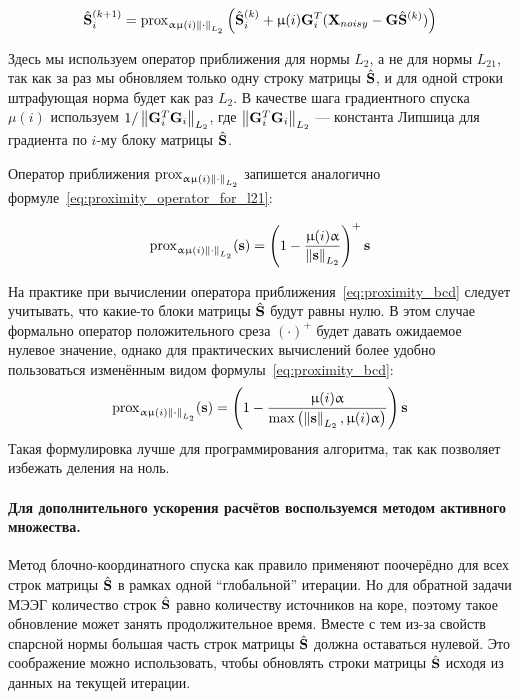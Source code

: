 \begin{equation}
    \hat{\mathbf{S}}_i^{(k+1)} = \operatorname{prox}_{\upalpha\upmu(i)\left\lVert\cdot\right\rVert_{L_{2}}} \left(\hat{\mathbf{S}}^{(k)}_i + \upmu(i) \mathbf{G}_i^T(\mathbf{X}_{noisy} - \mathbf{G}\hat{\mathbf{S}}^{(k)})\right)
    \label{eq:bcd_step}
\end{equation}

Здесь мы используем оператор приближения для нормы $L_2$, а не для нормы $L_{21}$,
так как за раз мы обновляем только одну строку матрицы $\hat{\mathbf{S}}$, и для одной строки штрафующая норма
будет как раз $L_2$.
В качестве шага градиентного спуска $\mu(i)$ используем $1/\left\lVert\mathbf{G}^T_i\mathbf{G}_i\right\rVert_{L_2}$,
где $\left\lVert\mathbf{G}^T_i\mathbf{G}_i\right\rVert_{L_2}$ --- константа Липшица для градиента по $i$-му блоку матрицы $\hat{\mathbf{S}}$.

Оператор приближения $\operatorname{prox}_{\upalpha\upmu(i)\left\lVert\cdot\right\rVert_{L_{2}}}$ запишется аналогично формуле~\ref{eq:proximity_operator_for_l21}:

\begin{equation}
    \operatorname{prox}_{\upalpha\upmu(i)\left\lVert\cdot\right\rVert_{L_{2}}}(\mathbf{s}) = \left(1 - \frac{\upmu(i)\upalpha}{\left\lVert\mathbf{s}\right\rVert_{L_2}}\right)^+\mathbf{s}
    \label{eq:proximity_bcd}
\end{equation}

На практике при вычислении оператора приближения~\ref{eq:proximity_bcd} следует
учитывать, что какие-то блоки матрицы $\hat{\mathbf{S}}$ будут равны нулю. В этом
случае формально оператор положительного среза $(\cdot)^+$ будет давать
ожидаемое нулевое значение, однако для практических вычислений более удобно
пользоваться изменённым видом формулы~\ref{eq:proximity_bcd}:
\begin{equation}
    \operatorname{prox}_{\upalpha\upmu(i)\left\lVert\cdot\right\rVert_{L_{2}}}(\mathbf{s}) = \left(1 - \frac{\upmu(i)\upalpha}{\max\left(\left\lVert\mathbf{s}\right\rVert_{L_2}, \upmu(i)\upalpha\right)}\right)\mathbf{s}
    \label{eq:proximity_bcd_refined}
\end{equation}
Такая формулировка лучше для программирования алгоритма, так как позволяет избежать деления на ноль.

\paragraph{Для дополнительного ускорения расчётов воспользуемся методом активного множества.}
Метод блочно-координатного спуска как правило применяют поочерёдно для всех строк матрицы
$\hat{\mathbf{S}}$ в рамках одной ``глобальной'' итерации. Но для обратной задачи МЭЭГ
количество строк $\hat{\mathbf{S}}$ равно количеству источников на коре, поэтому такое
обновление может занять продолжительное время. Вместе с тем из-за свойств спарсной
нормы большая часть строк матрицы $\hat{\mathbf{S}}$ должна оставаться нулевой. 
Это соображение можно использовать, чтобы обновлять строки матрицы $\hat{\mathbf{S}}$ исходя из
данных на текущей итерации.

